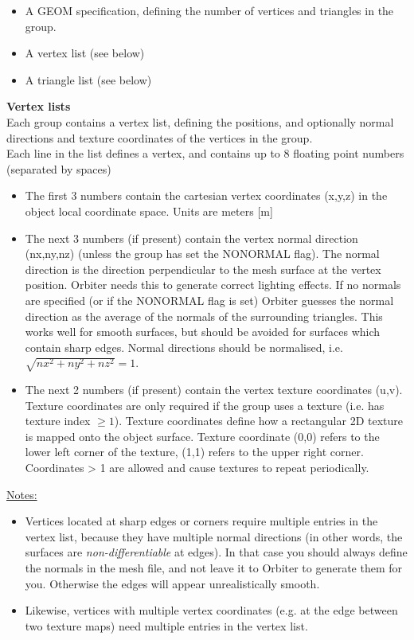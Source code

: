 \documentclass[Orbiter Developer Manual.tex]{subfiles}
\begin{document}
\begin{itemize}
\item A GEOM specification, defining the number of vertices and triangles in the group.
\item A vertex list (see below)
\item A triangle list (see below)
\end{itemize}

\noindent
\textbf{Vertex lists}\\
Each group contains a vertex list, defining the positions, and optionally normal directions and texture coordinates of the vertices in the group.\\
Each line in the list defines a vertex, and contains up to 8 floating point numbers (separated by spaces)

\begin{itemize}
\item The first 3 numbers contain the cartesian vertex coordinates (x,y,z) in the object local coordinate space. Units are meters [m]
\item The next 3 numbers (if present) contain the vertex normal direction (nx,ny,nz) (unless the group has set the NONORMAL flag). The normal direction is the direction perpendicular to the mesh surface at the vertex position. Orbiter needs this to generate correct lighting effects. If no normals are specified (or if the NONORMAL flag is set) Orbiter guesses the normal direction as the average of the normals of the surrounding triangles. This works well for smooth surfaces, but should be avoided for surfaces which contain sharp edges. Normal directions should be normalised, i.e. $\sqrt{nx^{2}+ny^{2}+nz^{2}} = 1$.
\item The next 2 numbers (if present) contain the vertex texture coordinates (u,v). Texture coordinates are only required if the group uses a texture (i.e. has texture index $\geq 1$). Texture coordinates define how a rectangular 2D texture is mapped onto the object surface. Texture coordinate (0,0) refers to the lower left corner of the texture, (1,1) refers to the upper right corner. Coordinates > 1 are allowed and cause textures to repeat periodically.
\end{itemize}

\noindent
\underline{Notes:}

\begin{itemize}
\item Vertices located at sharp edges or corners require multiple entries in the vertex list, because they have multiple normal directions (in other words, the surfaces are \textit{non-differentiable} at edges). In that case you should always define the normals in the mesh file, and not leave it to Orbiter to generate them for you. Otherwise the edges will appear unrealistically smooth.
\item Likewise, vertices with multiple vertex coordinates (e.g. at the edge between two texture maps) need multiple entries in the vertex list.
\end{itemize}
\end{document}
